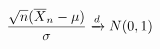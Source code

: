 \documentclass[preview]{standalone}
\begin{document}
\begin{align*}
\special{dvisvgm:raw <g id='unique000'>}\frac{\sqrt n(\overline X_n-\mu)}\sigma\xrightarrow{d}N(0,1)\special{dvisvgm:raw </g>}
\end{align*}
\end{document}
